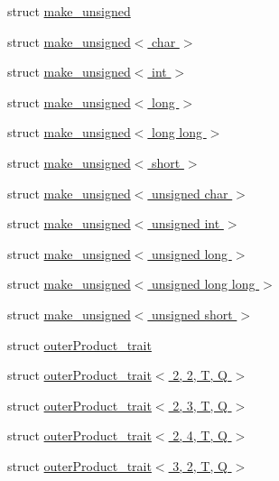 \begin{DoxyCompactItemize}
\item 
struct \hyperlink{structglm_1_1detail_1_1make__unsigned}{make\+\_\+unsigned}
\item 
struct \hyperlink{structglm_1_1detail_1_1make__unsigned_3_01char_01_4}{make\+\_\+unsigned$<$ char $>$}
\item 
struct \hyperlink{structglm_1_1detail_1_1make__unsigned_3_01int_01_4}{make\+\_\+unsigned$<$ int $>$}
\item 
struct \hyperlink{structglm_1_1detail_1_1make__unsigned_3_01long_01_4}{make\+\_\+unsigned$<$ long $>$}
\item 
struct \hyperlink{structglm_1_1detail_1_1make__unsigned_3_01long_01long_01_4}{make\+\_\+unsigned$<$ long long $>$}
\item 
struct \hyperlink{structglm_1_1detail_1_1make__unsigned_3_01short_01_4}{make\+\_\+unsigned$<$ short $>$}
\item 
struct \hyperlink{structglm_1_1detail_1_1make__unsigned_3_01unsigned_01char_01_4}{make\+\_\+unsigned$<$ unsigned char $>$}
\item 
struct \hyperlink{structglm_1_1detail_1_1make__unsigned_3_01unsigned_01int_01_4}{make\+\_\+unsigned$<$ unsigned int $>$}
\item 
struct \hyperlink{structglm_1_1detail_1_1make__unsigned_3_01unsigned_01long_01_4}{make\+\_\+unsigned$<$ unsigned long $>$}
\item 
struct \hyperlink{structglm_1_1detail_1_1make__unsigned_3_01unsigned_01long_01long_01_4}{make\+\_\+unsigned$<$ unsigned long long $>$}
\item 
struct \hyperlink{structglm_1_1detail_1_1make__unsigned_3_01unsigned_01short_01_4}{make\+\_\+unsigned$<$ unsigned short $>$}
\item 
struct \hyperlink{structglm_1_1detail_1_1outer_product__trait}{outer\+Product\+\_\+trait}
\item 
struct \hyperlink{structglm_1_1detail_1_1outer_product__trait_3_012_00_012_00_01_t_00_01_q_01_4}{outer\+Product\+\_\+trait$<$ 2, 2, T, Q $>$}
\item 
struct \hyperlink{structglm_1_1detail_1_1outer_product__trait_3_012_00_013_00_01_t_00_01_q_01_4}{outer\+Product\+\_\+trait$<$ 2, 3, T, Q $>$}
\item 
struct \hyperlink{structglm_1_1detail_1_1outer_product__trait_3_012_00_014_00_01_t_00_01_q_01_4}{outer\+Product\+\_\+trait$<$ 2, 4, T, Q $>$}
\item 
struct \hyperlink{structglm_1_1detail_1_1outer_product__trait_3_013_00_012_00_01_t_00_01_q_01_4}{outer\+Product\+\_\+trait$<$ 3, 2, T, Q $>$}

\end{DoxyCompactItemize}
